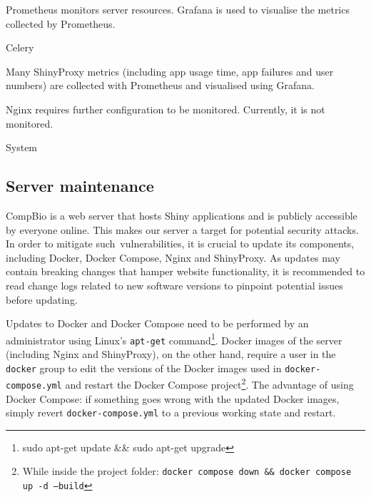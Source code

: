 Prometheus monitors server resources. Grafana is used to visualise the metrics collected by Prometheus.

Celery %

Many ShinyProxy metrics (including app usage time, app failures and user numbers) are collected with Prometheus and visualised using Grafana.

Nginx requires further configuration to be monitored. Currently, it is not monitored. %

System %

\subsection{Server maintenance}


CompBio is a web server that hosts Shiny applications and is publicly accessible by everyone online. This makes our server a target for potential security attacks. In order to mitigate such vulnerabilities, it is crucial to update its components, including Docker, Docker Compose, Nginx and ShinyProxy. As updates may contain breaking changes that hamper website functionality, it is recommended to read change logs related to new software versions to pinpoint potential issues before updating.


Updates to Docker and Docker Compose need to be performed by an administrator using Linux's \texttt{apt-get} command\footnote{sudo apt-get update \&\& sudo apt-get upgrade}. Docker images of the server (including Nginx and ShinyProxy), on the other hand, require a user in the \texttt{docker} group to edit the versions of the Docker images used in \texttt{docker-compose.yml} and restart the Docker Compose project\footnote{While inside the project folder: \texttt{docker compose down \&\& docker compose up -d --build}}. The advantage of using Docker Compose: if something goes wrong with the updated Docker images, simply revert \texttt{docker-compose.yml} to a previous working state and restart.

